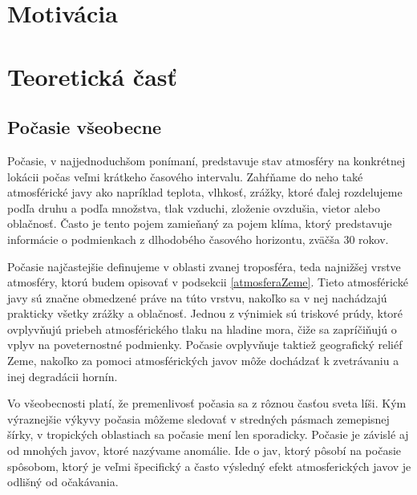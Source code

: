 
\section{Motivácia}

\section{Teoretická časť}

\subsection{Počasie všeobecne}
Počasie, v najjednoduchšom ponímaní, predstavuje stav atmosféry na konkrétnej lokácii počas veľmi krátkeho časového intervalu. Zahŕňame do neho také atmosférické javy ako napríklad teplota, vlhkosť, zrážky, ktoré ďalej rozdelujeme podľa druhu a podľa množstva, tlak vzduchi, zloženie ovzdušia, vietor alebo oblačnosť. Často je tento pojem zamieňaný za pojem klíma, ktorý predstavuje informácie o podmienkach z dlhodobého časového horizontu, zväčša 30 rokov.

Počasie najčastejšie definujeme v oblasti zvanej troposféra, teda najnižšej vrstve atmosféry, ktorú budem opisovať v podsekcii \ref{atmosferaZeme}. Tieto atmosférické javy sú značne obmedzené práve na túto vrstvu, nakoľko sa v nej nachádzajú prakticky všetky zrážky a oblačnosť. Jednou z výnimiek sú triskové prúdy, ktoré ovplyvňujú priebeh atmosférického tlaku na hladine mora, čiže sa zapríčiňujú o vplyv na poveternostné podmienky. Počasie ovplyvňuje taktiež geografický reliéf Zeme, nakoľko za pomoci atmosférických javov môže dochádzať k zvetrávaniu a inej degradácii hornín. 

Vo všeobecnosti platí, že premenlivosť počasia sa z rôznou časťou sveta líši. Kým výraznejšie výkyvy počasia môžeme sledovať v stredných pásmach zemepisnej šírky, v tropických oblastiach sa počasie mení len sporadicky. Počasie je závislé aj od mnohých javov, ktoré nazývame anomálie. Ide o jav, ktorý pôsobí na počasie spôsobom, ktorý je veľmi špecifický a často výsledný efekt atmosferických javov je odlišný od očakávania. 

